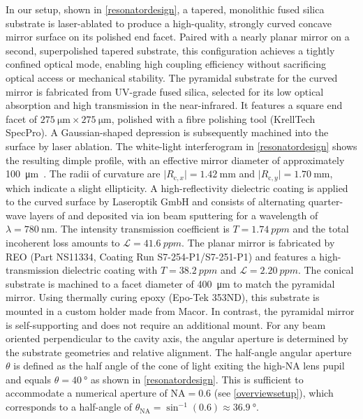 \documentclass[../Thesis-IJspeert.tex]{subfiles}
\begin{document}
In our setup, shown in \autoref{resonatordesign}, a tapered, monolithic fused silica substrate is  laser-ablated to produce a high-quality, strongly curved concave mirror surface on its polished end facet. Paired with a nearly planar mirror on a second, superpolished tapered substrate, this configuration achieves a tightly confined optical mode, enabling high coupling efficiency without sacrificing optical access or mechanical stability. The pyramidal substrate for the curved mirror is fabricated from UV-grade fused silica, selected for its low optical absorption and high transmission in the near-infrared. It features a square end facet of $\SI{275}{\micro\meter}\times\SI{275}{\micro\meter}$, polished with a fibre polishing tool (KrellTech SpecPro). A Gaussian-shaped depression is subsequently machined into the surface by laser ablation. The white-light interferogram in \autoref{resonatordesign} shows the resulting dimple profile, with an effective mirror diameter of approximately \SI{100}{\micro\meter}~\cite{doherty2021a}. The radii of curvature are $\lvert R_{\mathrm{c},x}\rvert = \SI{1.42}{\milli\meter}$ and $\lvert R_{\mathrm{c},y}\rvert = \SI{1.70}{\milli\meter}$, which indicate a slight ellipticity. A high-reflectivity dielectric coating is applied to the curved surface by Laseroptik GmbH and consists of alternating quarter-wave layers of  and  deposited via ion beam sputtering for a wavelength of $\lambda = \SI{780}{\nano\meter}$. The intensity transmission coefficient is $T = \SI{1.74}{ppm}$ and the total incoherent loss amounts to $\mathcal{L} = \SI{41.6}{ppm}$. The planar mirror is fabricated by REO (Part NS11334, Coating Run S7-254-P1/S7-251-P1) and features a high-transmission dielectric coating with $T = \SI{38.2}{ppm}$ and $\mathcal{L} = \SI{2.20}{ppm}$. The conical substrate is machined to a facet diameter of \SI{400}{\micro\meter} to match the pyramidal mirror. Using thermally curing epoxy (Epo-Tek 353ND), this substrate is mounted in a custom holder made from Macor. In contrast, the pyramidal mirror is self-supporting and does not require an additional mount. For any beam oriented perpendicular to the cavity axis, the angular aperture is determined by the substrate geometries and relative alignment. The half-angle angular aperture $\theta$ is defined as the half angle of the cone of light exiting the high-NA lens pupil and equals $\theta = \SI{40}{\degree}$ as shown in \autoref{resonatordesign}. This is sufficient to accommodate a numerical aperture of $\mathrm{NA} = 0.6$ (see \autoref{overviewsetup}), which corresponds to a half-angle of $\theta_{\mathrm{NA}} = \sin^{-1}(0.6) \approx \SI{36.9}{\degree}$.
\end{document}
